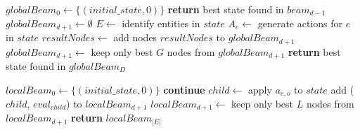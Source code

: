\documentclass[shortabstract, mgr, english]{iithesis}
\begin{document}
\begin{algorithm}[H]
\caption{Nested Beam Search (Global + Local Beams)}
\label{alg:NestedBeamSearch}
\begin{algorithmic}[1]
    \State $globalBeam_0 \gets \{(initial\_state, 0)\}$ 
            \State \textbf{return} best state found in $beam_{d-1}$
        \EndIf
        \State $globalBeam_{d+1} \gets \emptyset$ 
            \State $E \gets$ identify entities in $state$
                \State $A_e \gets$ generate actions for $e$ in $state$
            \EndFor
            \State $resultNodes \gets$  
            \State add nodes $resultNodes$ to $globalBeam_{d+1}$
        \EndFor
        \State {}
            \State $globalBeam_{d+1} \gets$ keep only best $G$ nodes from $globalBeam_{d+1}$
        \EndIf
    \EndFor
    \State \textbf{return} best state found in $globalBeam_D$
\EndProcedure
{}
\end{algorithmic}
\end{algorithm}

\begin{algorithm}[h]
\begin{algorithmic} [1]  
    \State $localBeam_0 \gets \{(initial\_state, 0)\}$ 
                    \State \textbf{continue}
                \EndIf
                    \State $child \gets$ apply $a_{e,o}$ to $state$
                    \State add ($child$, $eval_{child}$) to $localBeam_{d+1}$
                \EndFor
            \EndFor
            \State {}
                \State $localBeam_{d+1} \gets$ keep only best $L$ nodes from $localBeam_{d+1}$
            \EndIf
        \EndFor
    \EndFor
    \State \textbf{return} $localBeam_{|E|}$
\EndProcedure
\end{algorithmic}
\end{algorithm}
\end{document}
